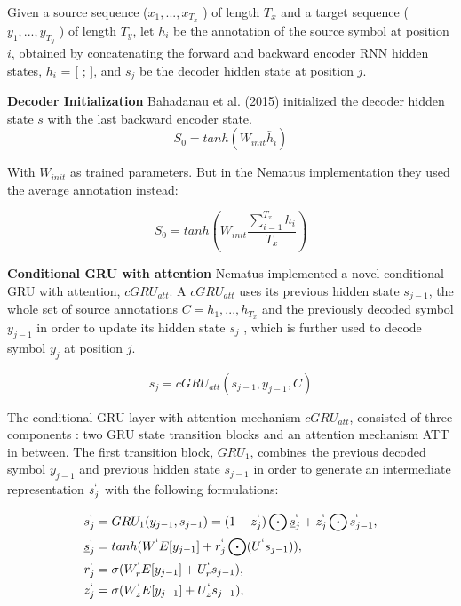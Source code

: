 Given a source sequence ($x_1, . . . , x_T_x$ ) of length $T_x$ and a target sequence ($y_1, . . . , y_T_y$ ) of length $T_y$, let $h_i$ be the annotation of the source symbol at position $i$, obtained by concatenating the forward and backward encoder RNN hidden states, $h_i$ = [ ;  ], and $s_j$ be the decoder hidden state at position $j$.

\textbf{Decoder Initialization} Bahadanau et al. (2015) initialized the decoder hidden state $s$ with the last backward encoder state.
\begin{equation}
S_0 = tanh (W_{init}\overleftarrow{h_i})
\end{equation}

With $W_{init}$ as trained parameters. But in the Nematus implementation they used the average annotation instead:

\begin{equation}
S_0 = tanh (W_{init} \frac{\sum_{i=1}^{T_x}h_i}{T_x})
\end{equation}

\textbf{Conditional GRU with attention} Nematus implemented a novel conditional GRU with attention, $cGRU_{att}$. A $cGRU_{att}$ uses its previous hidden state $s_{j-1}$, the whole set of source annotations $C = {h_1, . . . , h_T_x}$ and the previously decoded symbol $y_{j-1}$ in order to update its hidden state $s_j$ , which is further used to decode symbol $y_j$ at position $j$.

\begin{equation}
s_j= cGRU_{att}(s_{j-1},y_{j-1},C)
\end{equation}


The conditional GRU layer with attention mechanism $cGRU_{att}$, consisted of three components : two GRU state transition blocks and an attention mechanism ATT in between. The first transition block, $GRU_1$, combines the previous decoded symbol  $y_{j-1}$ and previous hidden state $s_{j-1}$ in order to generate an intermediate representation $s_j^`$ with the following formulations:


\begin{align*}
s_j^` &= GRU_1(y_{j-1},s_{j-1})=(1-z_j^`)\bigodot \underline{s}_j^`+z_j^`\bigodot s_{j-1}^`,\\
\underline{s}_j^`&= tanh(W^`E[y_{j-1}]+r_j^`\bigodot(U^`s_{j-1})),\\
{r}_j^`&= \sigma (W_r^`E[y_{j-1}]+U_r^`s_{j-1}),\\
{z}_j^`&= \sigma (W_z^`E[y_{j-1}]+U_z^`s_{j-1}),
\end{align*}

